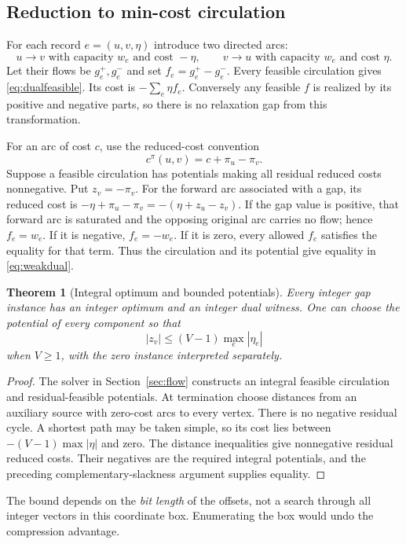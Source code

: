 \documentclass[11pt,letterpaper]{article}
\newtheorem{theorem}{Theorem}[section]
\theoremstyle{definition}
\theoremstyle{remark}\newtheorem{remark}[theorem]{Remark}
\begin{document}
\subsection{Reduction to min-cost circulation}

For each record $e=(u,v,\eta)$ introduce two directed arcs:
\[
 u\longrightarrow v\text{ with capacity }w_e\text{ and cost }-\eta,
 \qquad
 v\longrightarrow u\text{ with capacity }w_e\text{ and cost }\eta.
\]
Let their flows be $g_e^+,g_e^-$ and set $f_e=g_e^+-g_e^-$. Every feasible
circulation gives \eqref{eq:dualfeasible}. Its cost is $-\sum_e\eta f_e$.
Conversely any feasible $f$ is realized by its positive and negative parts,
so there is no relaxation gap from this transformation.

For an arc of cost $c$, use the reduced-cost convention
\[
 c^\pi(u,v)=c+\pi_u-\pi_v.
\]
Suppose a feasible circulation has potentials making all residual reduced
costs nonnegative. Put $z_v=-\pi_v$. For the forward arc associated with a gap,
its reduced cost is
$-\eta+\pi_u-\pi_v=-(\eta+z_u-z_v)$.
If the gap value is positive, that forward arc is saturated and the opposing
original arc carries no flow; hence $f_e=w_e$. If it is negative,
$f_e=-w_e$. If it is zero, every allowed $f_e$ satisfies the equality for that
term. Thus the circulation and its potential give equality in
\eqref{eq:weakdual}.

\begin{theorem}[Integral optimum and bounded potentials]
Every integer gap instance has an integer optimum and an integer dual witness.
One can choose the potential of every component so that
\[
 |z_v|\le (V-1)\max_e|\eta_e|
\]
when $V\ge1$, with the zero instance interpreted separately.
\end{theorem}
\begin{proof}
The solver in Section~\ref{sec:flow} constructs an integral feasible circulation
and residual-feasible potentials. At termination choose distances from an
auxiliary source with zero-cost arcs to every vertex. There is no negative
residual cycle. A shortest path may be taken simple, so its cost lies between
$-(V-1)\max|\eta|$ and zero. The distance inequalities give nonnegative
residual reduced costs. Their negatives are the required integral potentials,
and the preceding complementary-slackness argument supplies equality.
\end{proof}

The bound depends on the \emph{bit length} of the offsets, not a search through
all integer vectors in this coordinate box. Enumerating the box would undo
the compression advantage.
\end{document}
